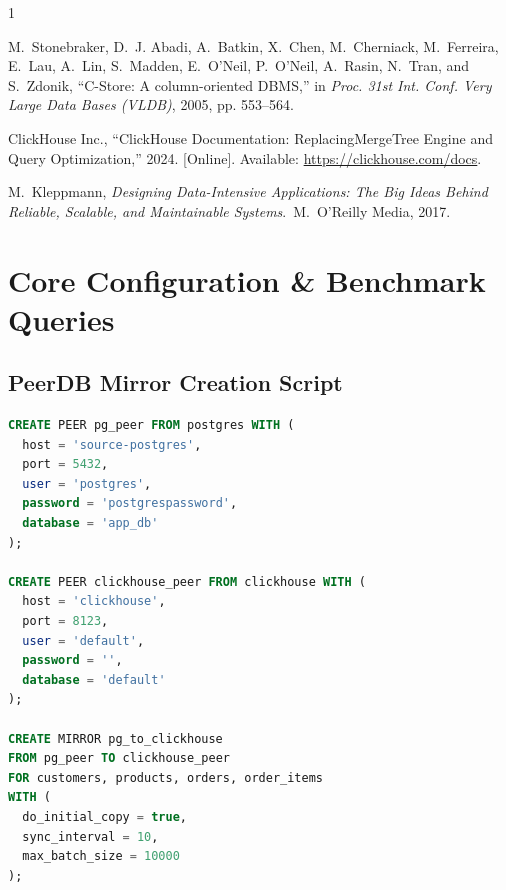 \documentclass[peerreviewca]{IEEEtran}
\begin{document}
\begin{thebibliography}{1}

M.~Stonebraker, D.~J. Abadi, A.~Batkin, X.~Chen, M.~Cherniack, M.~Ferreira, E.~Lau, A.~Lin, S.~Madden, E.~O'Neil, P.~O'Neil, A.~Rasin, N.~Tran, and S.~Zdonik, ``C-Store: A column-oriented DBMS,'' in \emph{Proc. 31st Int. Conf. Very Large Data Bases (VLDB)}, 2005, pp. 553--564.

ClickHouse Inc., ``ClickHouse Documentation: ReplacingMergeTree Engine and Query Optimization,'' 2024. [Online]. Available: \url{https://clickhouse.com/docs}.

M.~Kleppmann, \emph{Designing Data-Intensive Applications: The Big Ideas Behind Reliable, Scalable, and Maintainable Systems}.\ M.~O'Reilly Media, 2017.

\end{thebibliography}

\appendices

\section{Core Configuration \& Benchmark Queries}

\subsection{PeerDB Mirror Creation Script}
\begin{lstlisting}[language=SQL, caption={peerdb-setup/setup\_mirror.sql}]
CREATE PEER pg_peer FROM postgres WITH (
  host = 'source-postgres',
  port = 5432,
  user = 'postgres',
  password = 'postgrespassword',
  database = 'app_db'
);

CREATE PEER clickhouse_peer FROM clickhouse WITH (
  host = 'clickhouse',
  port = 8123,
  user = 'default',
  password = '',
  database = 'default'
);

CREATE MIRROR pg_to_clickhouse
FROM pg_peer TO clickhouse_peer
FOR customers, products, orders, order_items
WITH (
  do_initial_copy = true,
  sync_interval = 10,
  max_batch_size = 10000
);
\end{lstlisting}
\end{document}
